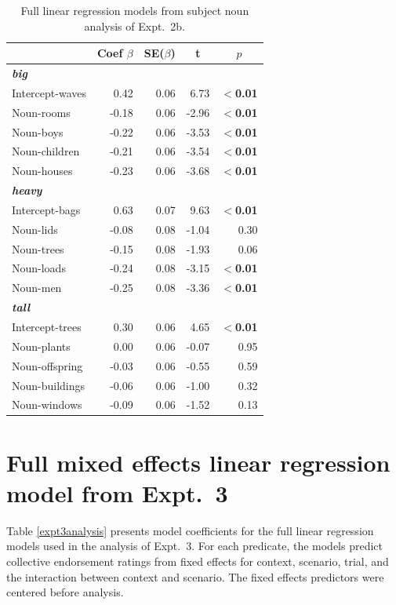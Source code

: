 \documentclass[preprint,12pt,authoryear,titlepage]{elsarticle}
\begin{document}
\begin{table}[htb] 
	\renewcommand\thetable{B.2}
	\centering \caption{Full linear regression models from subject noun analysis of Expt.~2b.} \label{expt2banalysis}
	\begin{tabular}{lrrrr}\toprule
		&	Coef $\beta$	&	SE($\beta$)	&	\multicolumn{1}{c}{ \textbf{t}}	&	\multicolumn{1}{c}{$p$}\\ \midrule
		\emph{\textbf{big}} \\
		Intercept-waves& 	0.42 &	0.06	&	6.73	&	\textbf{$<$0.01} \\
		Noun-rooms	&	-0.18	&   0.06	&	-2.96&	\textbf{$<$0.01} \\
		Noun-boys	&	-0.22&   0.06	&	-3.53	&	\textbf{$<$0.01} \\
		Noun-children	&	-0.21	&   0.06	&	-3.54	&	\textbf{$<$0.01} \\
		Noun-houses	&	-0.23	&   0.06	&	-3.68	&	\textbf{$<$0.01} \\ \hline
		\emph{\textbf{heavy}}\\
		Intercept-bags	& 	0.63	&   0.07	&	9.63	&	\textbf{$<$0.01} \\
		Noun-lids		&	-0.08	&   0.08	&	-1.04	&	0.30\\
		Noun-trees	&	-0.15	&   0.08	&	-1.93	&	0.06 \\
		Noun-loads	&	-0.24	&   0.08	&	-3.15	&	\textbf{$<$0.01} \\
		Noun-men		&	-0.25	&   0.08	&	-3.36	&	\textbf{$<$0.01} \\ \hline
		\emph{\textbf{tall}}\\
		Intercept-trees	& 	0.30	&	0.06	&	4.65	&	\textbf{$<$0.01} \\
		Noun-plants	&	0.00	&   0.06	&	-0.07	&	0.95 \\
		Noun-offspring	&	-0.03	&   0.06	&	-0.55	&	0.59 \\
		Noun-buildings	&	-0.06	&   0.06	&	-1.00	&	0.32 \\
		Noun-windows	&	-0.09	&   0.06	&	-1.52	&	0.13 \\
		\bottomrule
	\end{tabular}
\end{table}

\section{Full mixed effects linear regression model from Expt.~3}\label{expt3results}

Table \ref{expt3analysis} presents model coefficients for the full linear regression models used in the analysis of Expt.~3. For each predicate, the models predict collective endorsement ratings from fixed effects for context, scenario, trial, and the interaction between context and scenario. The fixed effects predictors were centered before analysis.
\end{document}

